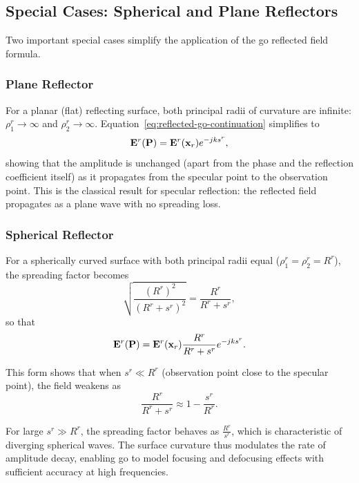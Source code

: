 \subsection{Special Cases: Spherical and Plane Reflectors}

Two important special cases simplify the application of the \gls{go} reflected field formula.

\subsubsection{Plane Reflector}

For a planar (flat) reflecting surface, both principal radii of curvature are infinite: $\rho_1^r \to \infty$ and $\rho_2^r \to \infty$. Equation~\eqref{eq:reflected-go-continuation} simplifies to
\begin{equation}
  \mathbf{E}^r(\mathbf{P}) = \mathbf{E}^r(\mathbf{x}_r) e^{-j k s^r},
\end{equation}
showing that the amplitude is unchanged (apart from the phase and the reflection coefficient itself) as it propagates from the specular point to the observation point. This is the classical result for specular reflection: the reflected field propagates as a plane wave with no spreading loss.

\subsubsection{Spherical Reflector}

For a spherically curved surface with both principal radii equal ($\rho_1^r = \rho_2^r = R^r$), the spreading factor becomes
\begin{equation}
  \sqrt{\frac{(R^r)^2}{(R^r + s^r)^2}} = \frac{R^r}{R^r + s^r},
\end{equation}
so that
\begin{equation}
  \mathbf{E}^r(\mathbf{P}) = \mathbf{E}^r(\mathbf{x}_r) \frac{R^r}{R^r + s^r} e^{-j k s^r}.
\end{equation}

This form shows that when $s^r \ll R^r$ (observation point close to the specular point), the field weakens as
\begin{equation}
  \frac{R^r}{R^r + s^r} \approx 1 - \frac{s^r}{R^r}.
\end{equation}

For large $s^r \gg R^r$, the spreading factor behaves as $\tfrac{R^r}{s^r}$, which is characteristic of diverging spherical waves. The surface curvature thus modulates the rate of amplitude decay, enabling \gls{go} to model focusing and defocusing effects with sufficient accuracy at high frequencies.

